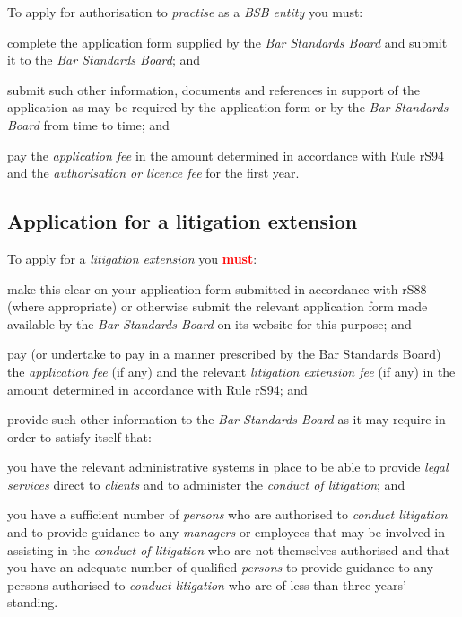 
To apply for authorisation to \emph{practise} as a \emph{BSB entity} you
must:\nl\item complete the application form supplied by the \emph{Bar Standards
Board} and submit it to the \emph{Bar Standards Board}; and
\item submit such other information, documents and references in support of
the application as may be required by the application form or by the
\emph{Bar Standards Board} from time to time; and
\item pay the \emph{application fee} in the amount determined in accordance
with Rule rS94 and the \emph{authorisation or licence fee} for the first
year.
\ln
\subsection{Application for a litigation extension}


To apply for a \emph{litigation extension} you \textcolor{red}{\textbf{must}}:\nl\item make this clear on your application form submitted in accordance with
rS88 (where appropriate) or otherwise submit the relevant application
form made available by the \emph{Bar Standards Board} on its website for
this purpose; and
\item pay (or undertake to pay in a manner prescribed by the Bar Standards
Board) the \emph{application fee} (if any) and the relevant
\emph{litigation extension fee} (if any) in the amount determined in
accordance with Rule rS94; and
\item provide such other information to the \emph{Bar Standards Board} as
it may require in order to satisfy itself that:
\al
\item you have the relevant administrative systems in place to be able to
provide \emph{legal services} direct to \emph{clients} and to administer
the \emph{conduct of litigation}; and

\item you have a sufficient number of \emph{persons} who are authorised to
\emph{conduct litigation} and to provide guidance to any \emph{managers}
or employees that may be involved in assisting in the \emph{conduct of
litigation} who are not themselves authorised and that you have an
adequate number of qualified \emph{persons} to provide guidance to any
persons authorised to \emph{conduct litigation} who are of less than
three years' standing.
\la 
\ln
{}



